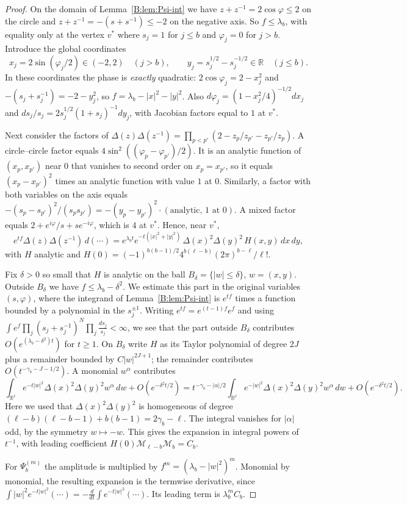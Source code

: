 \documentclass[11pt,a4paper]{article}
\theoremstyle{definition}
\theoremstyle{remark}
\newcommand{\R}{\mathbb R}
\numberwithin{equation}{section}
\begin{document}
\begin{proof}
On the domain of Lemma~\ref{B:lem:Psi-int} we have $z+z^{-1}=2\cos\varphi\le2$ on the circle and $z+z^{-1}=-(s+s^{-1})\le-2$ on the negative axis. So $f\le\lambda_b$, with equality only at the vertex $v^*$ where $s_j=1$ for $j\le b$ and $\varphi_j=0$ for $j>b$. Introduce the global coordinates
\[
x_j=2\sin(\varphi_j/2)\in(-2,2)\quad(j>b),\qquad y_j=s_j^{1/2}-s_j^{-1/2}\in\R\quad(j\le b).
\]
In these coordinates the phase is \emph{exactly} quadratic: $2\cos\varphi_j=2-x_j^2$ and $-(s_j+s_j^{-1})=-2-y_j^2$, so $f=\lambda_b-|x|^2-|y|^2$. Also $d\varphi_j=(1-x_j^2/4)^{-1/2}dx_j$ and $ds_j/s_j=2s_j^{1/2}(1+s_j)^{-1}dy_j$, with Jacobian factors equal to $1$ at $v^*$.

Next consider the factors of $\Delta(z)\Delta(z^{-1})=\prod_{p<p'}(2-z_p/z_{p'}-z_{p'}/z_p)$. A circle--circle factor equals $4\sin^2((\varphi_p-\varphi_{p'})/2)$. It is an analytic function of $(x_p,x_{p'})$ near $0$ that vanishes to second order on $x_p=x_{p'}$, so it equals $(x_p-x_{p'})^2$ times an analytic function with value $1$ at $0$. Similarly, a factor with both variables on the axis equals $-(s_p-s_{p'})^2/(s_ps_{p'})=-(y_p-y_{p'})^2\cdot(\text{analytic, }1\text{ at }0)$. A mixed factor equals $2+e^{i\varphi}/s+se^{-i\varphi}$, which is $4$ at $v^*$. Hence, near $v^*$,
\[
e^{tf}\Delta(z)\Delta(z^{-1})\,d(\cdots)=e^{\lambda_bt}e^{-t(|x|^2+|y|^2)}\,\Delta(x)^2\Delta(y)^2\,H(x,y)\,dx\,dy,
\]
with $H$ analytic and $H(0)=(-1)^{b(b-1)/2}4^{b(\ell-b)}(2\pi)^{b-\ell}/\ell!$.

Fix $\delta>0$ so small that $H$ is analytic on the ball $B_\delta=\{|w|\le\delta\}$, $w=(x,y)$. Outside $B_\delta$ we have $f\le\lambda_b-\delta^2$. We estimate this part in the original variables $(s,\varphi)$, where the integrand of Lemma~\ref{B:lem:Psi-int} is $e^{tf}$ times a function bounded by a polynomial in the $s_j^{\pm1}$. Writing $e^{tf}=e^{(t-1)f}e^{f}$ and using $\int e^{f}\prod_j(s_j+s_j^{-1})^N\prod_j\frac{ds_j}{s_j}<\infty$, we see that the part outside $B_\delta$ contributes $O(e^{(\lambda_b-\delta^2)t})$ for $t\ge1$. On $B_\delta$ write $H$ as its Taylor polynomial of degree $2J$ plus a remainder bounded by $C|w|^{2J+1}$; the remainder contributes $O(t^{-\gamma_b-J-1/2})$. A monomial $w^\alpha$ contributes
\[
\int_{\R^\ell}e^{-t|w|^2}\Delta(x)^2\Delta(y)^2w^\alpha\,dw+O(e^{-\delta^2t/2})=t^{-\gamma_b-|\alpha|/2}\int_{\R^\ell}e^{-|w|^2}\Delta(x)^2\Delta(y)^2w^\alpha\,dw+O(e^{-\delta^2t/2}).
\]
Here we used that $\Delta(x)^2\Delta(y)^2$ is homogeneous of degree $(\ell-b)(\ell-b-1)+b(b-1)=2\gamma_b-\ell$. The integral vanishes for $|\alpha|$ odd, by the symmetry $w\mapsto-w$. This gives the expansion in integral powers of $t^{-1}$, with leading coefficient $H(0)\mathcal M_{\ell-b}\mathcal M_b=C_b$.

For $\Psi_b^{(m)}$ the amplitude is multiplied by $f^m=(\lambda_b-|w|^2)^m$. Monomial by monomial, the resulting expansion is the termwise derivative, since $\int|w|^2e^{-t|w|^2}(\cdots)=-\frac{d}{dt}\int e^{-t|w|^2}(\cdots)$. Its leading term is $\lambda_b^mC_b$.
\end{proof}
\end{document}
